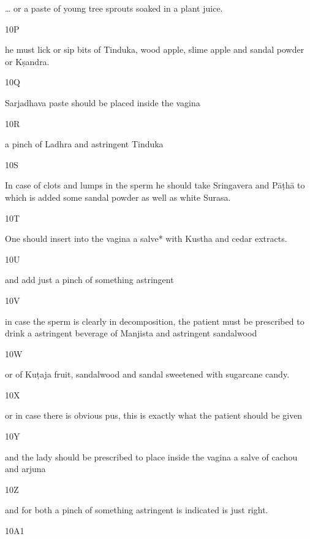 \begin{translation}
\begin{tt}
… or a paste of young tree sprouts soaked in a plant juice.
  
\item[10P]

he must lick or sip bits of Tinduka, wood apple, slime apple and sandal 
  powder or Kṣandra.
  
\item[10Q]

 Sarjadhava paste should be placed inside the vagina
  
\item[10R]

a pinch of Ladhra and astringent Tinduka
  
\item[10S]

In case of clots and lumps in the sperm he should take Sringavera and 
  Pāṭhā to which is added some sandal powder as well as white Surasa.
  
\item[10T]

One should insert into the vagina a salve* with Kustha and cedar 
  extracts.
  
\item[10U]

and add just a pinch of something astringent
  
\item[10V]

in case the sperm is clearly in decomposition, the patient must be 
  prescribed to drink a astringent beverage of Manjista and astringent sandalwood
  
\item[10W]

or of Kuṭaja fruit, sandalwood and sandal sweetened with sugarcane 
  candy.
  
\item[10X]

or in case there is obvious pus, this is exactly what the patient should 
  be given
  
\item[10Y]

 and the lady should be prescribed to place  inside the vagina a salve of 
  cachou and arjuna
  
\item[10Z]

and for both a pinch of something astringent is indicated is just right.
  
\item[10A1]


\end{tt}
\end{translation}
